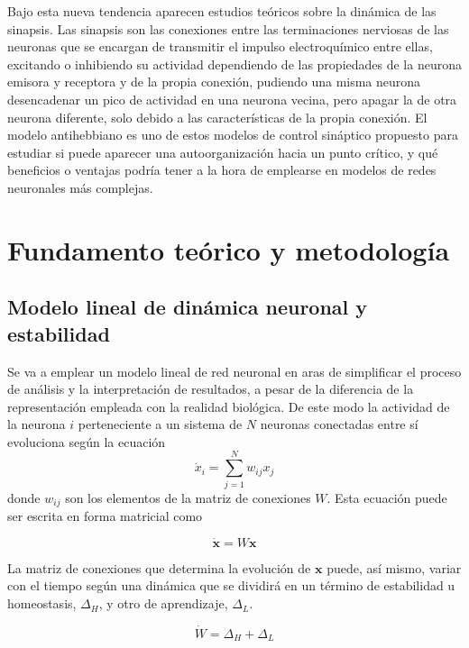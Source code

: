 \documentclass[11pt,a4paper,twoside,pdf]{article}
\numberwithin{equation}{section}
\begin{document}
Bajo esta nueva tendencia aparecen estudios teóricos sobre la dinámica de las sinapsis. Las sinapsis son las conexiones entre las terminaciones nerviosas de las neuronas que se encargan de transmitir el impulso electroquímico entre ellas, excitando o inhibiendo su actividad dependiendo de las propiedades de la neurona emisora y receptora y de la propia conexión, pudiendo una misma neurona desencadenar un pico de actividad en una neurona vecina, pero apagar la de otra neurona diferente, solo debido a las características de la propia conexión. El modelo antihebbiano es uno de estos modelos de control sináptico propuesto para estudiar si puede aparecer una autoorganización hacia un punto crítico, y qué beneficios o ventajas podría tener a la hora de emplearse en modelos de redes neuronales más complejas.

\section{Fundamento teórico y metodología}
\subsection{Modelo lineal de dinámica neuronal y estabilidad}
\label{sec: Modelo lineal de dinámica neuronal y estabilidad}
Se va a emplear un modelo lineal de red neuronal en aras de simplificar el proceso de análisis y la interpretación de resultados, a pesar de la diferencia de la representación empleada con la realidad biológica. De este modo la actividad de la neurona \(i\) perteneciente a un sistema de \(N\) neuronas conectadas entre sí evoluciona según la ecuación
\begin{equation}
  \dot{x}_i = \sum_{j=1}^N w_{ij}x_j
\end{equation}
donde \(w_{ij}\) son los elementos de la matriz de conexiones \(W\). Esta ecuación puede ser escrita en forma matricial como 

\begin{equation}
  \dot{\mathbf{x}} = W\mathbf{x}
  \label{eq:evolución actividad}
\end{equation}

La matriz de conexiones que determina la evolución de \(\mathbf{x}\) puede, así mismo, variar con el tiempo según una dinámica que se dividirá en un término de estabilidad u homeostasis, \(\Delta_H\), y otro de aprendizaje, \(\Delta_L\).

\begin{equation}
  \dot{W} = \Delta_H + \Delta_L
  \label{eq:evolución conexiones}
\end{equation}
\end{document}
